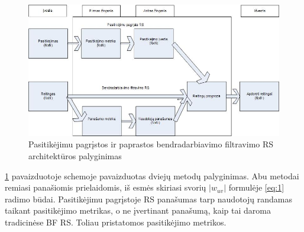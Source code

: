 \documentclass{VUMIFInfMagistrinis}
\begin{document}
\begin{figure}[ht!]
	\centering
	\includegraphics[width=160mm]{Drawing1.jpg}
	\caption{Pasitikėjimu pagrįstos ir paprastos bendradarbiavimo filtravimo RS architektūros palyginimas \label{5_vs_BF}}
\end{figure}

\ref{5_vs_BF} pavaizduotoje schemoje pavaizduotas dviejų metodų palyginimas. Abu metodai remiasi panašiomis prielaidomis, iš esmės skiriasi svorių $|w_{uv}|$ formulėje \eqref{eq:1} radimo būdai. Pasitikėjimu pagrįstoje RS panašumas tarp naudotojų randamas taikant pasitikėjimo metrikas, o ne įvertinant panašumą, kaip tai daroma tradicinėse BF RS. Toliau pristatomos pasitikėjimo metrikos.
\end{document}
